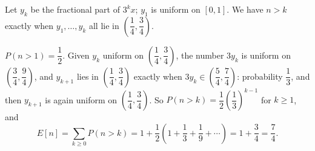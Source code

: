 Let $y_k$ be the fractional part of $3^kx$; $y_1$ is uniform on $[0,1]$. We have $n>k$ exactly when $y_1,\dots,y_k$ all lie in $\left(\dfrac14,\dfrac34\right)$.

$P(n>1)=\dfrac12$. Given $y_k$ uniform on $\left(\dfrac14,\dfrac34\right)$, the number $3y_k$ is uniform on $\left(\dfrac34,\dfrac94\right)$, and $y_{k+1}$ lies in $\left(\dfrac14,\dfrac34\right)$ exactly when $3y_k\in\left(\dfrac54,\dfrac74\right)$: probability $\dfrac13$, and then $y_{k+1}$ is again uniform on $\left(\dfrac14,\dfrac34\right)$. So $P(n>k)=\dfrac12\left(\dfrac13\right)^{k-1}$ for $k\ge1$, and
\[E[n]=\sum_{k\ge0}P(n>k)=1+\dfrac12\left(1+\dfrac13+\dfrac19+\cdots\right)=1+\dfrac34=\boxed{\dfrac74}.\]
